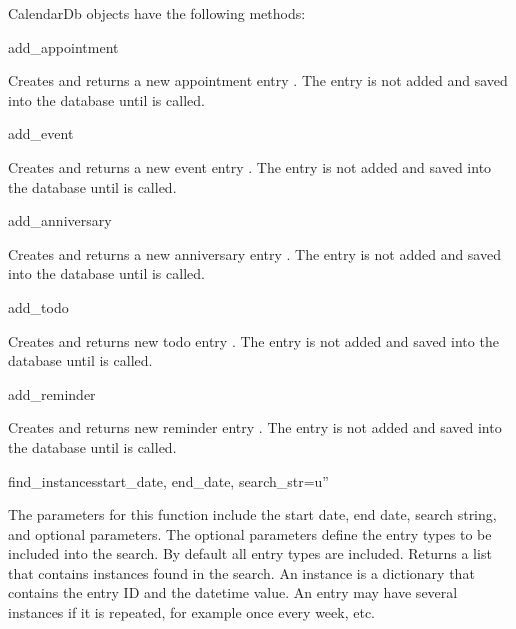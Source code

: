 \begin{classdesc*}{CalendarDb}
 objects have the following methods:

\begin{methoddesc}[CalendarDb]{add_appointment}{}

Creates and returns a new appointment entry . The 
entry is not added and saved into the database until  is 
called.

\end{methoddesc}

\begin{methoddesc}[CalendarDb]{add_event}{}

Creates and returns a new event entry . The entry is not added 
and saved into the database until  is called.

\end{methoddesc}

\begin{methoddesc}[CalendarDb]{add_anniversary}{}

Creates and returns a new anniversary entry . The entry 
is not added and saved into the database until  is called.

\end{methoddesc}

\begin{methoddesc}[CalendarDb]{add_todo}{}

Creates and returns new todo entry . The entry is not added and 
saved into the database until  is called.

\end{methoddesc}

\begin{methoddesc}[CalendarDb]{add_reminder}{}

Creates and returns new reminder entry . The entry is not added and 
saved into the database until  is called.

\end{methoddesc}

\begin{methoddesc}[CalendarDb]{find_instances}{start_date, end_date, search_str=u''}

The parameters for this function include the start date, end date, search 
string, and optional parameters. The optional parameters define the entry 
types to be included into the search. By default all entry types are 
included. Returns a list that contains  instances found in the 
search. An instance is a dictionary that contains the entry ID and the 
datetime value. An entry may have several instances if it is repeated, for 
example once every week, etc. 


\end{methoddesc}
\end{classdesc*}
